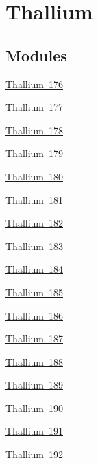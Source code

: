 \hypertarget{group___isotope_const-_thallium}{}\section{Thallium}
\label{group___isotope_const-_thallium}
\subsection*{Modules}
\begin{DoxyCompactItemize}
\item 
\mbox{\hyperlink{group___isotope_const-_thallium-_tl176}{Thallium 176}}
\item 
\mbox{\hyperlink{group___isotope_const-_thallium-_tl177}{Thallium 177}}
\item 
\mbox{\hyperlink{group___isotope_const-_thallium-_tl178}{Thallium 178}}
\item 
\mbox{\hyperlink{group___isotope_const-_thallium-_tl179}{Thallium 179}}
\item 
\mbox{\hyperlink{group___isotope_const-_thallium-_tl180}{Thallium 180}}
\item 
\mbox{\hyperlink{group___isotope_const-_thallium-_tl181}{Thallium 181}}
\item 
\mbox{\hyperlink{group___isotope_const-_thallium-_tl182}{Thallium 182}}
\item 
\mbox{\hyperlink{group___isotope_const-_thallium-_tl183}{Thallium 183}}
\item 
\mbox{\hyperlink{group___isotope_const-_thallium-_tl184}{Thallium 184}}
\item 
\mbox{\hyperlink{group___isotope_const-_thallium-_tl185}{Thallium 185}}
\item 
\mbox{\hyperlink{group___isotope_const-_thallium-_tl186}{Thallium 186}}
\item 
\mbox{\hyperlink{group___isotope_const-_thallium-_tl187}{Thallium 187}}
\item 
\mbox{\hyperlink{group___isotope_const-_thallium-_tl188}{Thallium 188}}
\item 
\mbox{\hyperlink{group___isotope_const-_thallium-_tl189}{Thallium 189}}
\item 
\mbox{\hyperlink{group___isotope_const-_thallium-_tl190}{Thallium 190}}
\item 
\mbox{\hyperlink{group___isotope_const-_thallium-_tl191}{Thallium 191}}
\item 
\mbox{\hyperlink{group___isotope_const-_thallium-_tl192}{Thallium 192}}
\item 

\end{DoxyCompactItemize}
